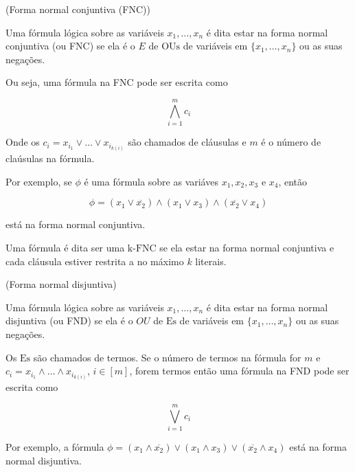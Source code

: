 \begin{defi} (Forma normal conjuntiva (FNC))

Uma fórmula lógica sobre as variáveis $x_{1}, \dots , x_{n}$ é dita estar na forma normal conjuntiva (ou FNC) se ela é o $E$ de $\text{OUs}$ de variáveis em $\{x_{1}, \dots, x_{n}\}$ ou as suas negações.

Ou seja, uma fórmula na FNC pode ser escrita como

\begin{equation*}
\bigwedge_{i = 1}^{m} c_{i}
\end{equation*}

Onde os $c_{i} = x_{i_{1}} \lor \dots \lor x_{i_{k(i)}}$ são chamados de cláusulas e $m$ é o número de claúsulas na fórmula.

\end{defi}

Por exemplo, se $\phi$ é uma fórmula sobre as variáves $x_{1}, x_{2}, x_{3} \text{ e } x_{4}$, então

\begin{equation*}
\phi = (x_{1} \lor \overline{x_{2}}) \land (x_{1} \lor x_{3}) \land (\overline{x_{2}} \lor x_{4})
\end{equation*}

está na forma normal conjuntiva.

Uma fórmula é dita ser uma $\text{k-FNC}$ se ela estar na forma normal conjuntiva e cada cláusula estiver restrita a no máximo $k$ literais.

\begin{defi} (Forma normal disjuntiva)

Uma fórmula lógica sobre as variáveis $x_{1}, \dots , x_{n}$ é dita estar na forma normal disjuntiva (ou FND) se ela é o $OU$ de $\text{Es}$ de variáveis em $\{x_{1}, \dots , x_{n}\}$ ou as suas negações.

Os $\text{Es}$ são chamados de termos. Se o número de termos na fórmula for $m$ e \linebreak $c_{i} = x_{i_{1}} \land \dots \land x_{i_{k(i)}}$, $i \in [m]$, forem termos então uma fórmula na FND pode ser escrita como

\begin{equation*}
\bigvee_{i = 1}^{m} c_{i}
\end{equation*}

\end{defi}

Por exemplo, a fórmula $\phi = (x_{1} \land \overline{x_{2}}) \lor (x_{1} \land x_{3}) \lor (\overline{x_{2}} \land x_{4})$ está na forma normal disjuntiva.

